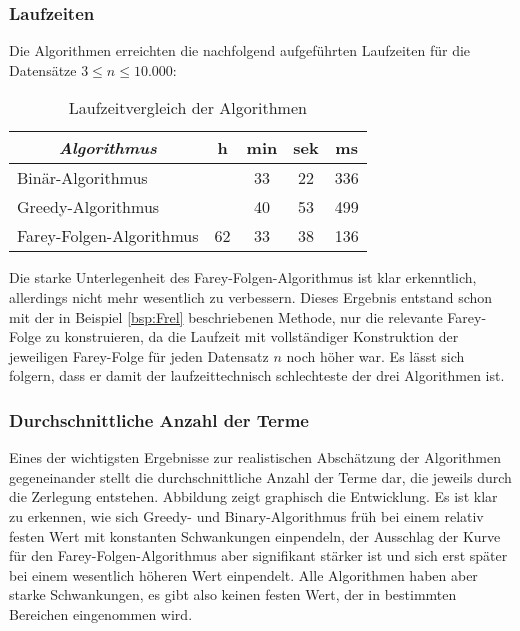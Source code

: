 \subsubsection{Laufzeiten}
Die Algorithmen erreichten die nachfolgend aufgeführten Laufzeiten für die Datensätze $3 \leq n \leq 10.000$:\\
\begin{table}[H]
	\centering
	\begin{tabular}{|l | c c c c|}
		\hline
		\multicolumn{1}{|c|}{\emph{Algorithmus}} & h & min & sek & ms \\ \hline
		Binär-Algorithmus & & 33 & 22 & 336 \\ \hline
		Greedy-Algorithmus & & 40 &  53 & 499 \\ \hline
		Farey-Folgen-Algorithmus & 62 & 33 & 38 & 136 \\ \hline
	\end{tabular}
	\caption{Laufzeitvergleich der Algorithmen}
	\label{table:LaufzeitVgl}
\end{table}
Die starke Unterlegenheit des Farey-Folgen-Algorithmus ist klar erkenntlich, allerdings nicht mehr wesentlich zu verbessern. Dieses Ergebnis entstand schon mit der in Beispiel \ref{bsp:Frel} beschriebenen Methode, nur die relevante Farey-Folge zu konstruieren, da die Laufzeit mit vollständiger Konstruktion der jeweiligen Farey-Folge für jeden Datensatz $n$ noch höher war. Es lässt sich folgern, dass er damit der laufzeittechnisch schlechteste der drei Algorithmen ist.

\subsubsection{Durchschnittliche Anzahl der Terme}
Eines der wichtigsten Ergebnisse zur realistischen Abschätzung der Algorithmen gegeneinander stellt die durchschnittliche Anzahl der Terme dar, die jeweils durch die Zerlegung entstehen. Abbildung zeigt graphisch die Entwicklung. Es ist klar zu erkennen, wie sich Greedy- und Binary-Algorithmus früh bei einem relativ festen Wert mit konstanten Schwankungen einpendeln, der Ausschlag der Kurve für den Farey-Folgen-Algorithmus aber signifikant stärker ist und sich erst später bei einem wesentlich höheren Wert einpendelt. Alle Algorithmen haben aber starke Schwankungen, es gibt also keinen festen Wert, der in bestimmten Bereichen eingenommen wird.

